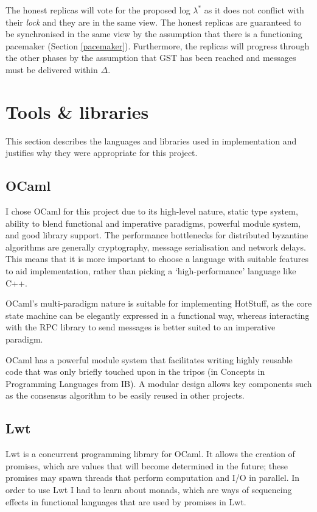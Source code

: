 The honest replicas will vote for the proposed log $\lambda^*$ as it does not conflict with their \textit{lock} and they are in the same view. The honest replicas are guaranteed to be synchronised in the same view by the assumption that there is a functioning pacemaker (Section \ref{pacemaker}). Furthermore, the replicas will progress through the other phases by the assumption that GST has been reached and messages must be delivered within $\Delta$.

\section{Tools \& libraries} \label{tools}
This section describes the languages and libraries used in implementation and justifies why they were appropriate for this project.

\subsection{OCaml}
I chose OCaml \cite{ocaml} for this project due to its high-level nature, static type system, ability to blend functional and imperative paradigms, powerful module system, and good library support. The performance bottlenecks for distributed byzantine algorithms are generally cryptography, message serialisation and network delays. This means that it is more important to choose a language with suitable features to aid implementation, rather than picking a `high-performance' language like C++.

OCaml's multi-paradigm nature is suitable for implementing HotStuff, as the core state machine can be elegantly expressed in a functional way, whereas interacting with the RPC library to send messages is better suited to an imperative paradigm.

OCaml has a powerful module system that facilitates writing highly reusable code that was only briefly touched upon in the tripos (in Concepts in Programming Languages from IB). A modular design allows key components such as the consensus algorithm to be easily reused in other projects.

\subsection{Lwt}
Lwt \cite{lwt} is a concurrent programming library for OCaml. It allows the creation of promises, which are values that will become determined in the future; these promises may spawn threads that perform computation and I/O in parallel. In order to use Lwt I had to learn about monads, which are ways of sequencing effects in functional languages that are used by promises in Lwt.

